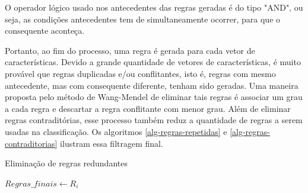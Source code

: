 \documentclass[template.tex]{subfiles}
\begin{document}



O operador lógico usado nos antecedentes das regras geradas é do tipo "AND", ou seja, as condições antecedentes tem de simultaneamente ocorrer, para que o consequente aconteça.

Portanto, ao fim do processo, uma regra é gerada para cada vetor de características. Devido a grande quantidade de vetores de características, é muito provável que regras duplicadas e/ou conflitantes, isto é, regras com mesmo antecedente, mas com consequente diferente, tenham sido geradas. Uma maneira proposta pelo método de Wang-Mendel de eliminar tais regras é associar um grau a cada regra e descartar a regra conflitante com menor grau. Além de eliminar regras contraditórias, esse processo também reduz a quantidade de regras a serem usadas na classificação. Os algoritmos \ref{alg-regras-repetidas} e \ref{alg-regras-contraditorias} ilustram essa filtragem final.

\begin{algorithm}
\begin{algorithmic}[1]
\caption{Eliminação de regras redundantes}
\label{alg-regras-repetidas}
           \STATE $Regras\_finais \leftarrow R_i$
       \ENDIF    
   \ENDFOR
\ENDFOR
\end{algorithmic}
\end{algorithm}
\end{document}

